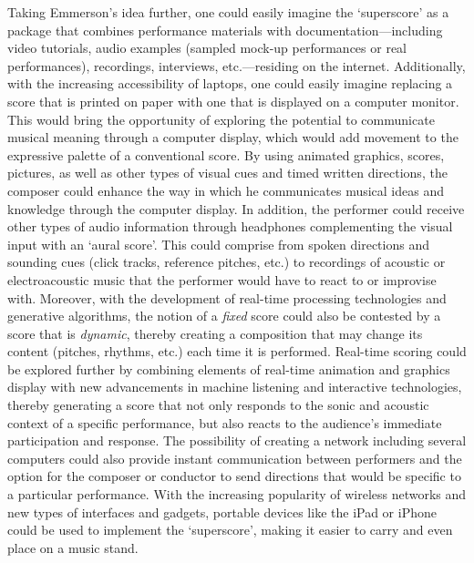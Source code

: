 Taking Emmerson's idea further, one could easily imagine the `superscore' as a package that combines performance materials with documentation---including video tutorials, audio examples (sampled mock-up performances or real performances), recordings, interviews, etc.---residing on the internet. Additionally, with the increasing accessibility of laptops, one could easily imagine replacing a score that is printed on paper with one that is displayed on a computer monitor. This would bring the opportunity of exploring the potential to communicate musical meaning through a computer display, which would add movement to the expressive palette of a conventional score. By using animated graphics, scores, pictures, as well as other types of visual cues and timed written directions, the composer could enhance the way in which he communicates musical ideas and knowledge through the computer display. In addition, the performer could receive other types of audio information through headphones complementing the visual input with an `aural score'. This could comprise from spoken directions and sounding cues (click tracks, reference pitches,  etc.) to recordings of acoustic or electroacoustic music that the performer would have to react to or improvise with. Moreover, with the development of real-time processing technologies and generative algorithms, the notion of a \emph{fixed} score could also be contested by a score that is \emph{dynamic}, thereby creating a composition that may change its content (pitches, rhythms, etc.) each time it is performed. Real-time scoring could be explored further by combining elements of real-time animation and graphics display with new advancements in machine listening and interactive technologies, thereby generating a score that not only responds to the sonic and acoustic context of a specific performance, but also reacts to the audience's immediate participation and response. The possibility of creating a network including several computers could also provide instant communication between performers and the option for the composer or conductor to send directions that would be specific to a particular performance. With the increasing popularity of wireless networks and new types of interfaces and gadgets, portable devices like the iPad or iPhone could be used to implement the `superscore', making it easier to carry and even place on a music stand. 

